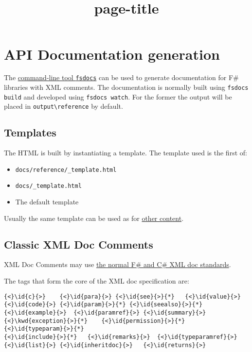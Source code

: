 \documentclass{article}
\title{{page-title}}
\date{}
\newcommand{\id}[1]{\textcolor{black}{#1}}
\newcommand{\kwd}[1]{\textcolor{navy}{#1}}
\begin{document}
\maketitle

\section*{API Documentation generation}



The \href{commandline.html}{command-line tool \texttt{fsdocs}} can be used to generate documentation
for F\# libraries with XML comments.  The documentation is normally built using \texttt{fsdocs build} and developed using \texttt{fsdocs watch}. For
the former the output will be placed in \texttt{output{\textbackslash}reference} by default.
\subsection*{Templates}



The HTML is built by instantiating a template. The template used is the first of:
\begin{itemize}
\item 

\texttt{docs/reference/\_template.html}

\item 

\texttt{docs/\_template.html}

\item 

The default template

\end{itemize}



Usually the same template can be used as for \href{content.html}{other content}.
\subsection*{Classic XML Doc Comments}



XML Doc Comments may use \href{https://docs.microsoft.com/en-us/dotnet/csharp/programming-guide/xmldoc/}{the normal F\# and C\# XML doc standards}.


The tags that form the core of the XML doc specification are:
\begin{Verbatim}[commandchars=\\\{\}]
{<}\id{c}{>}	{<}\id{para}{>}	{<}\id{see}{>}{*}	{<}\id{value}{>}
{<}\id{code}{>}	{<}\id{param}{>}{*}	{<}\id{seealso}{>}{*}	
{<}\id{example}{>}	{<}\id{paramref}{>}	{<}\id{summary}{>}	
{<}\kwd{exception}{>}{*}	{<}\id{permission}{>}{*}	{<}\id{typeparam}{>}{*}	
{<}\id{include}{>}{*}	{<}\id{remarks}{>}	{<}\id{typeparamref}{>}	
{<}\id{list}{>}	{<}\id{inheritdoc}{>}	{<}\id{returns}{>}	

\end{Verbatim}
\end{document}
